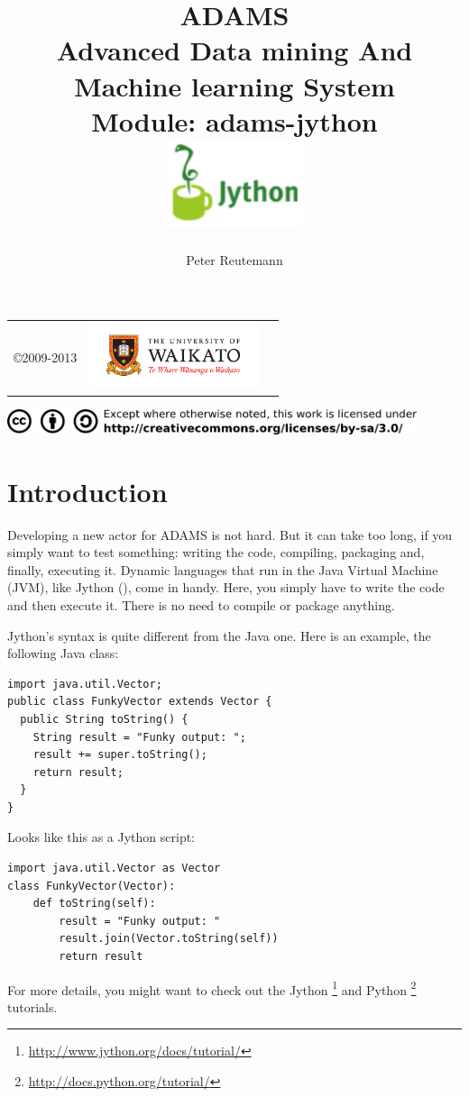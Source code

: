 \documentclass[a4paper]{book}
\title{
  \textbf{ADAMS} \\
  {\Large \textbf{A}dvanced \textbf{D}ata mining \textbf{A}nd \textbf{M}achine
  learning \textbf{S}ystem} \\
  {\Large Module: adams-jython} \\
  \vspace{1cm}
  \includegraphics[width=4cm]{images/jython_logo.png} \\
}
\author{
  Peter Reutemann
}
\begin{document}
\begin{titlepage}
\maketitle

\thispagestyle{empty}
\center
\begin{table}[b]
	\begin{tabular}{c l l}
		\parbox[c][2cm]{2cm}{\copyright 2009-2013} &
		\parbox[c][2cm]{5cm}{\includegraphics[width=5cm]{images/coat_of_arms.pdf}} \\
	\end{tabular}
	\includegraphics[width=12cm]{images/cc.png} \\
\end{table}

\end{titlepage}

\tableofcontents
\listoffigures

\chapter{Introduction}
Developing a new actor for ADAMS is not hard. But it can take too long, if you
simply want to test something: writing the code, compiling, packaging and,
finally, executing it. Dynamic languages that run in the Java Virtual Machine
(JVM), like Jython (\cite{jython}), come in handy. Here, you simply have to
write the code and then execute it. There is no need to compile or package anything.

Jython's syntax is quite different from the Java one. Here is an example, the
following Java class:
\begin{verbatim}
import java.util.Vector;
public class FunkyVector extends Vector {
  public String toString() {
    String result = "Funky output: ";
    result += super.toString();
    return result;
  }
}
\end{verbatim}
Looks like this as a Jython script:
\begin{verbatim}
import java.util.Vector as Vector
class FunkyVector(Vector):
    def toString(self):
        result = "Funky output: "
        result.join(Vector.toString(self))
        return result
\end{verbatim}
For more details, you might want to check out the Jython
\footnote{\url{http://www.jython.org/docs/tutorial/}{}} and Python
\footnote{\url{http://docs.python.org/tutorial/}{}} tutorials.
\end{document}
